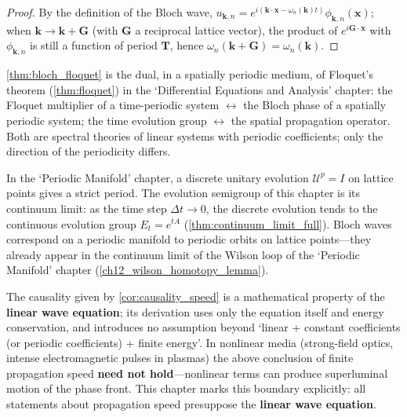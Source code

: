 \begin{proof}
By the definition of the Bloch wave, $u_{\mathbf{k},n} = e^{i(\mathbf{k}\cdot\mathbf{x}-\omega_n(\mathbf{k})t)}\phi_{\mathbf{k},n}(\mathbf{x})$; when $\mathbf{k}\to\mathbf{k}+\mathbf{G}$ (with $\mathbf{G}$ a reciprocal lattice vector), the product of $e^{i\mathbf{G}\cdot\mathbf{x}}$ with $\phi_{\mathbf{k},n}$ is still a function of period $\mathbf{T}$, hence $\omega_n(\mathbf{k}+\mathbf{G}) = \omega_n(\mathbf{k})$.
\end{proof}

\begin{remark}\label{rem:propagation_floquet}
\cref{thm:bloch_floquet} is the dual, in a spatially periodic medium, of Floquet's theorem (\cref{thm:floquet}) in the `Differential Equations and Analysis' chapter: the Floquet multiplier of a time-periodic system $\leftrightarrow$ the Bloch phase of a spatially periodic system; the time evolution group $\leftrightarrow$ the spatial propagation operator. Both are spectral theories of linear systems with periodic coefficients; only the direction of the periodicity differs.
\end{remark}

\begin{remark}\label{rem:propagation_periodic_manifold}
In the `Periodic Manifold' chapter, a discrete unitary evolution $\mathcal{U}^p=I$ on lattice points gives a strict period. The evolution semigroup of this chapter is its continuum limit: as the time step $\Delta t\to 0$, the discrete evolution tends to the continuous evolution group $E_t = e^{tA}$ (\cref{thm:continuum_limit_full}). Bloch waves correspond on a periodic manifold to periodic orbits on lattice points---they already appear in the continuum limit of the Wilson loop of the `Periodic Manifold' chapter (\cref{ch12_wilson_homotopy_lemma}).
\end{remark}

\begin{remark}\label{rem:propagation_causality_boundary}
The causality given by \cref{cor:causality_speed} is a mathematical property of the \textbf{linear wave equation}; its derivation uses only the equation itself and energy conservation, and introduces no assumption beyond `linear + constant coefficients (or periodic coefficients) + finite energy'. In nonlinear media (strong-field optics, intense electromagnetic pulses in plasmas) the above conclusion of finite propagation speed \textbf{need not hold}---nonlinear terms can produce superluminal motion of the phase front. This chapter marks this boundary explicitly: all statements about propagation speed presuppose the \textbf{linear wave equation}.
\end{remark}

